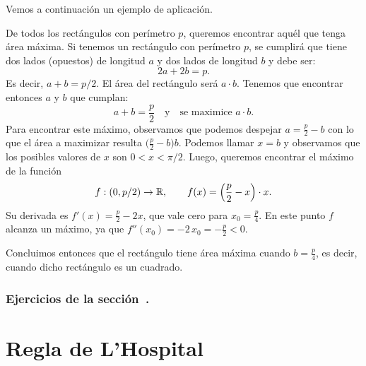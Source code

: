 Vemos a continuación un ejemplo de aplicación.
\begin{example}
    De todos los rectángulos con perímetro $p$, queremos encontrar aquél que tenga área máxima.
    Si tenemos un rectángulo con perímetro $p$, se cumplirá que tiene dos lados (opuestos) de longitud $a$ y dos lados de longitud $b$ y debe ser:
    \[ 2a+2b=p.\]
    Es decir, $a+b=p/2$. El área del rectángulo será $a\cdot b$. Tenemos que encontrar entonces $a$ 
    y $b$ que cumplan:
    \[
    a+b=\frac p2\quad\text{y}\quad \text{se maximice }a\cdot b.
    \]
    Para encontrar este máximo, observamos que podemos despejar $a=\frac p2-b$ con lo que el área a maximizar resulta $\big(\frac p2-b\big)b$. Podemos llamar $x=b$ y observamos que los posibles valores de $x$ son $0<x<\pi/2$. Luego, queremos encontrar el máximo de la función
    \[
    f:(0,p/2)\to \mathbb{R},\qquad
    f(x)=\Big(\frac p 2 - x\Big)\cdot x.
    \]
    Su derivada es $f'(x) = \frac p2-2x$, que vale cero para $x_0=\frac p4$. 
    En este punto $f$ alcanza un máximo, ya que $f''(x_0) = -2 \, x_0=-\frac p2< 0$.

    Concluimos entonces que el rectángulo tiene área máxima cuando $b=\frac p4$, es decir, cuando dicho rectángulo es un cuadrado.
\end{example}

\subsubsection*{Ejercicios de la sección~.}

\begin{enumerate}

\end{enumerate}


\section{Regla de L'Hospital}

